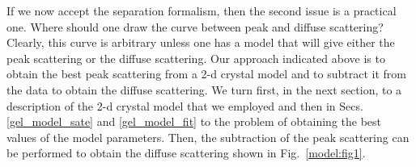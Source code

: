 If we now accept the separation formalism, then the second issue is a practical one.
Where should one draw the curve between peak and diffuse scattering?
Clearly, this curve is arbitrary unless one has a model that will give
either the peak scattering or the diffuse scattering.  Our 
approach indicated above is to obtain the best peak scattering from a
2-d crystal model and to subtract it from the data to obtain the
diffuse scattering.  We turn first, in the next section, to a description of
the 2-d crystal model that we employed and then in Secs. \ref{gel_model_sate}
and \ref{gel_model_fit}
to the problem of obtaining the best values of the model parameters.
Then, the subtraction of the peak scattering can be performed to obtain
the diffuse scattering shown in Fig.\ \ref{model:fig1}.

